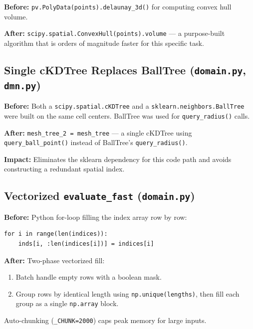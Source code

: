 \documentclass[11pt,a4paper]{article}
\begin{document}
\textbf{Before:} \texttt{pv.PolyData(points).delaunay\_3d()} for computing convex hull volume.

\textbf{After:} \texttt{scipy.spatial.ConvexHull(points).volume} --- a purpose-built algorithm that is orders of magnitude faster for this specific task.

\subsection{Single cKDTree Replaces BallTree (\texttt{domain.py}, \texttt{dmn.py})}

\textbf{Before:} Both a \texttt{scipy.spatial.cKDTree} and a \texttt{sklearn.neighbors.BallTree} were built on the same cell centers. BallTree was used for \texttt{query\_radius()} calls.

\textbf{After:} \texttt{mesh\_tree\_2 = mesh\_tree} --- a single cKDTree using \texttt{query\_ball\_point()} instead of BallTree's \texttt{query\_radius()}.

\textbf{Impact:} Eliminates the sklearn dependency for this code path and avoids constructing a redundant spatial index.

\subsection{Vectorized \texttt{evaluate\_fast} (\texttt{domain.py})}

\textbf{Before:} Python for-loop filling the index array row by row:
\begin{lstlisting}
for i in range(len(indices)):
    inds[i, :len(indices[i])] = indices[i]
\end{lstlisting}

\textbf{After:} Two-phase vectorized fill:
\begin{enumerate}[nosep]
    \item Batch handle empty rows with a boolean mask.
    \item Group rows by identical length using \texttt{np.unique(lengths)}, then fill each group as a single \texttt{np.array} block.
\end{enumerate}

Auto-chunking (\texttt{\_CHUNK=2000}) caps peak memory for large inputs.
\end{document}
